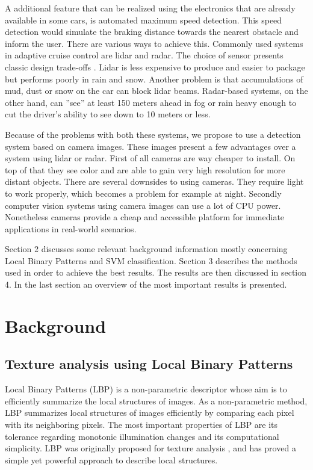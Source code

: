 \documentclass[runningheads,a4paper]{llncs}
\begin{document}
A additional feature that can be realized using the electronics that are already available in some cars, is automated maximum speed detection. This speed detection would simulate the braking distance towards the nearest obstacle and inform the user. There are various ways to achieve this. Commonly used systems in adaptive cruise control are lidar and radar.  The choice of sensor presents classic design trade-offs \cite{Jones2001}.  Lidar  is  less  expensive  to  produce  and  easier  to package  but  performs  poorly  in  rain  and  snow. Another problem is that accumulations of mud, dust or snow on the car can block lidar beams. Radar-based  systems,  on  the  other  hand,  can ''see'' at least 150 meters ahead in fog or rain heavy enough to cut the driver’s ability to see down to 10  meters  or  less. 

Because of the problems with both these systems, we propose to use a detection system based on camera images. These images present a few advantages over a system using lidar or radar. First of all cameras are way cheaper to install. On top of that they see color and are able to gain very high resolution for more distant objects. There are several downsides to using cameras. They require light to work properly, which becomes a problem for example at night. Secondly computer vision systems using camera images can use a lot of CPU power. Nonetheless cameras provide a cheap and accessible platform for immediate applications in real-world scenarios. 

Section 2 discusses some relevant background information mostly concerning Local Binary Patterns and SVM classification. Section 3 describes the methods used in order to achieve the best results. The results are then discussed in section 4. In the last section an overview of the most important results is presented.

\section{Background}
\subsection{Texture analysis using Local Binary Patterns}
Local Binary Patterns (LBP) \cite{Huang2011} is a non-parametric descriptor whose aim is to efficiently summarize the local structures of images. As a non-parametric method, LBP summarizes local structures of images efficiently by comparing each pixel with its neighboring pixels. The most important properties of LBP are its tolerance regarding monotonic illumination changes and its computational simplicity. LBP was originally proposed for texture analysis \cite{Ojala1996}, and has proved a simple yet powerful approach to describe local structures. 
\end{document}
